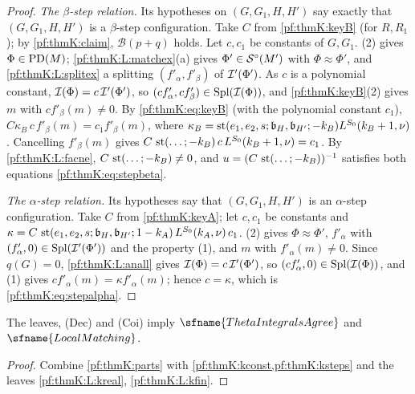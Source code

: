 \begin{proof}
\emph{The $\beta$-step relation.} Its hypotheses on $(G,G_1,H,H')$ say exactly that $(G,G_1,H,H')$ is a $\beta$-step
configuration. Take $C$ from \cref{pf:thmK:keyB} (for $R,R_1$); by \cref{pf:thmK:claim}, $\mathcal B(p+q)$ holds. Let
$c,c_1$ be constants of $G,G_1$. (2) gives $\Phi\in\operatorname{PD}(M)$; \ref{pf:thmK:L:matchex}(a) gives
$\Phi'\in\mathcal{S}^{\circ}(M')$ with $\Phi\approx\Phi'$, and \ref{pf:thmK:L:splitex} a splitting $(f'_\alpha,f'_\beta)$ of
$\mathcal{I}'(\Phi')$. As $c$ is a polynomial constant, $\mathcal{I}(\Phi)=c\,\mathcal{I}'(\Phi')$, so $(cf'_\alpha,cf'_\beta)\in
\operatorname{Spl}(\mathcal{I}(\Phi))$, and \cref{pf:thmK:keyB}(2) gives $m$ with $cf'_\beta(m)\ne0$. By \eqref{pf:thmK:eq:keyB} (with the
polynomial constant $c_1$), $C\kappa_B\,c\,f'_\beta(m)=c_1f'_\beta(m)$, where $\kappa_B=\operatorname{st}(e_1,e_2,s;\mathfrak
b_H,\mathfrak b_{H'};-k_B)L^{S_0}(k_B+1,\nu)$. Cancelling $f'_\beta(m)$ gives $C\,\operatorname{st}(\dots;-k_B)\,c\,L^{S_0}(k_B+1,\nu)
=c_1$. By \ref{pf:thmK:L:facne}, $C\,\operatorname{st}(\dots;-k_B)\ne0$, and $u=(C\,\operatorname{st}(\dots;-k_B))^{-1}$ satisfies both equations
\eqref{pf:thmK:eq:stepbeta}.

\emph{The $\alpha$-step relation.} Its hypotheses say that $(G,G_1,H,H')$ is an $\alpha$-step configuration. Take $C$ from
\cref{pf:thmK:keyA}; let $c,c_1$ be constants and $\kappa=C\,\operatorname{st}(e_1,e_2,s;\mathfrak b_H,\mathfrak
b_{H'};1-k_A)\,L^{S_0}(k_A,\nu)\,c_1$. (2) gives $\Phi\approx\Phi'$, $f'_\alpha$ with
$(f'_\alpha,0)\in\operatorname{Spl}(\mathcal{I}'(\Phi'))$ and the property (1), and $m$ with $f'_\alpha(m)\ne0$. Since $q(G)=0$,
\ref{pf:thmK:L:anall} gives $\mathcal{I}(\Phi)=c\,\mathcal{I}'(\Phi')$, so $(cf'_\alpha,0)\in\operatorname{Spl}(\mathcal{I}(\Phi))$, and (1) gives
$cf'_\alpha(m)=\kappa f'_\alpha(m)$; hence $c=\kappa$, which is \eqref{pf:thmK:eq:stepalpha}.
\end{proof}

\begin{theorem}\label{pf:thmK:agree}
The leaves, \textup{(Dec)} and \textup{(Coi)} imply $\sfname{ThetaIntegralsAgree}$ and $\sfname{LocalMatching}$.
\end{theorem}

\begin{proof}
Combine \cref{pf:thmK:parts} with \cref{pf:thmK:kconst,pf:thmK:ksteps} and the leaves \ref{pf:thmK:L:kreal},
\ref{pf:thmK:L:kfin}.
\end{proof}


